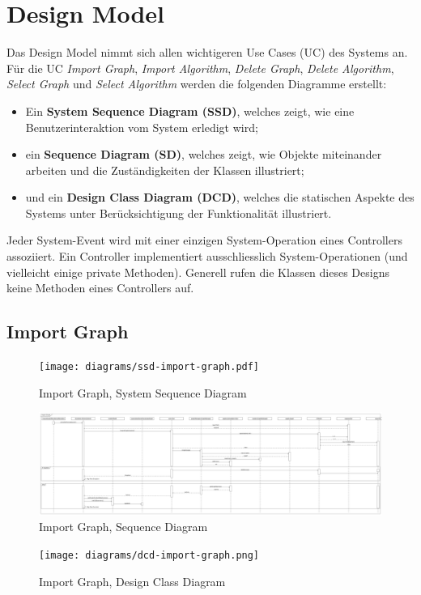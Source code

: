 \section{Design Model}
\label{sec:Design Model}
Das Design Model nimmt sich allen wichtigeren Use Cases (UC) des Systems an. F\"ur die UC  \textit{Import Graph}, \textit{Import Algorithm}, \textit{Delete Graph}, \textit{Delete Algorithm}, \textit{Select Graph} und \textit{Select Algorithm} werden die folgenden Diagramme erstellt:
\begin{itemize}
  \item Ein \textbf{System Sequence Diagram (SSD)}, welches zeigt, wie eine Benutzerinteraktion vom System erledigt wird; 
  \item ein \textbf{Sequence Diagram (SD)}, welches zeigt, wie Objekte miteinander arbeiten und die Zust\"andigkeiten der Klassen illustriert; 
  \item und ein \textbf{Design Class Diagram (DCD)}, welches die statischen Aspekte des Systems unter Ber\"ucksichtigung der Funktionalit\"at illustriert.
\end{itemize}
Jeder System-Event wird mit einer einzigen System-Operation eines Controllers assoziiert. Ein Controller implementiert ausschliesslich System-Operationen (und vielleicht einige private Methoden). Generell rufen die Klassen dieses Designs keine Methoden eines Controllers auf.
\newpage
% 
\subsection{Import Graph}
\begin{figure}[H]
    \texttt{[image: diagrams/ssd-import-graph.pdf]}
    \caption{Import Graph, System Sequence Diagram}
    \label{fig:import-graph-ssd}
\end{figure}
\begin{figure}[H]
    \includegraphics[width=\textwidth]{diagrams/sd-import-graph.png}
    \caption{Import Graph, Sequence Diagram}
    \label{fig:import-graph-sd}
\end{figure}
\begin{figure}[H]
    \texttt{[image: diagrams/dcd-import-graph.png]}
    \caption{Import Graph, Design Class Diagram}
    \label{fig:import-graph-dcd}
\end{figure}
\newpage
% 

